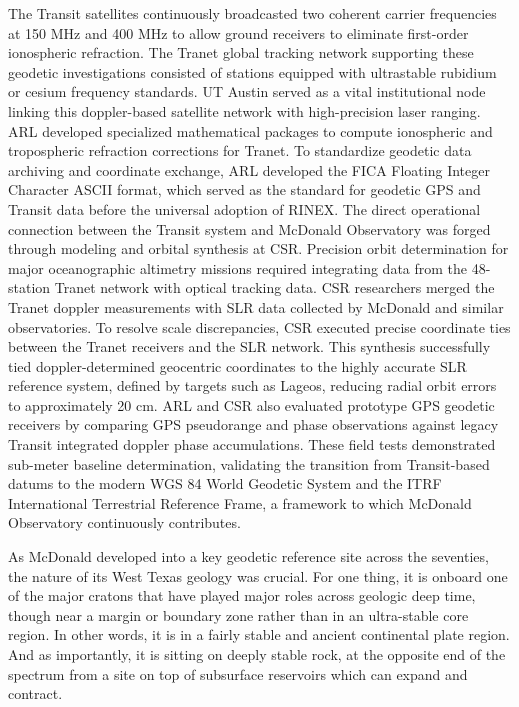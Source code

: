 The Transit satellites continuously broadcasted two coherent carrier frequencies at 150 MHz and 400 MHz to allow ground receivers to eliminate first-order ionospheric refraction. The Tranet global tracking network supporting these geodetic investigations consisted of stations equipped with ultrastable rubidium or cesium frequency standards. UT Austin served as a vital institutional node linking this doppler-based satellite network with high-precision laser ranging. ARL developed specialized mathematical packages to compute ionospheric and tropospheric refraction corrections for Tranet. To standardize geodetic data archiving and coordinate exchange, ARL developed the FICA Floating Integer Character ASCII format, which served as the standard for geodetic GPS and Transit data before the universal adoption of RINEX.
The direct operational connection between the Transit system and McDonald Observatory was forged through modeling and orbital synthesis at CSR. Precision orbit determination for major oceanographic altimetry missions required integrating data from the 48-station Tranet network with optical tracking data. CSR researchers merged the Tranet doppler measurements with SLR data collected by McDonald and similar observatories. To resolve scale discrepancies, CSR executed precise coordinate ties between the Tranet receivers and the SLR network. This synthesis successfully tied doppler-determined geocentric coordinates to the highly accurate SLR reference system, defined by targets such as Lageos, reducing radial orbit errors to approximately 20 cm. ARL and CSR also evaluated prototype GPS geodetic receivers by comparing GPS pseudorange and phase observations against legacy Transit integrated doppler phase accumulations. These field tests demonstrated sub-meter baseline determination, validating the transition from Transit-based datums to the modern WGS 84 World Geodetic System and the ITRF International Terrestrial Reference Frame, a framework to which McDonald Observatory continuously contributes.

As McDonald developed into a key geodetic reference site across the seventies, the nature of its West Texas geology was crucial. For one thing, it is onboard one of the major cratons that have played major roles across geologic deep time, though near a margin or boundary zone rather than in an ultra-stable core region. In other words, it is in a fairly stable and ancient continental plate region. And as importantly, it is sitting on deeply stable rock, at the opposite end of the spectrum from a site on top of subsurface reservoirs which can expand and contract. 

